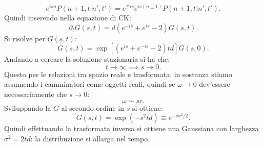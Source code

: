 \[
    e^{isn}P\left(n\pm 1, t|n',t'\right) = e^{\mp is} e^{is(n\pm 1)}P\left(n\pm 1, t|n',t'\right)
.\] 
Quindi inserendo nella equazione di CK:
\[
    \partial_{t}G(s,t) =d\left(e^{-is}+ e^{is}-2\right)G(s,t) 
.\] 
Si risolve per $G(s,t)$:
\[
    G(s,t) = \exp \left[\left(e^{is}+e^{-is}-2\right)td\right]G(s,0) 
.\] 
Andando a cercare la soluzione stazionaria si ha che:
\[
t\to \infty \implies s\to 0
.\] 
Questo per le relazioni tra spazio reale e trasformata: in sostanza stiamo assumendo i camminatori come oggetti reali, quindi se $\omega\to 0$ dev'essere necessariamente che $s\to 0$:
\[
    \omega  \sim sc
.\] 
Sviluppando la $G$ al secondo ordine in $s$ si ottiene:
\[
    G(s,t) = \exp(-s^2td)  \equiv e^{-s \sigma^2 /2}
.\] 
Quindi effettuando la trasformata inversa si ottiene una Gaussiana con larghezza $\sigma^2 = 2td$: la distribuzione si allarga nel tempo.
